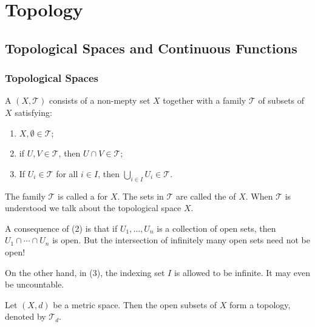 \part{Topology}
\chapter{Topological Spaces and Continuous Functions}
\section{Topological Spaces}
\begin{definition}
A  $(X,\mathcal{T})$ consists of a non-mepty set $X$ together with a family $\mathcal{T}$ of subsets of $X$ satisfying:
\begin{enumerate}[label=(\arabic*)]
\item $X,\emptyset\in\mathcal{T}$;
\item if $U,V\in\mathcal{T}$, then $U\cap V\in\mathcal{T}$;
\item If $U_i\in\mathcal{T}$ for all $i\in I$, then $\bigcup_{i\in I}U_i\in\mathcal{T}$.
\end{enumerate}
The family $\mathcal{T}$ is called a  for $X$. The sets in $\mathcal{T}$ are called the  of $X$. When $\mathcal{T}$ is understood we talk about the topological space $X$.
\end{definition}

\begin{remark}
A consequence of (2) is that if $U_1,\dots,U_n$ is a collection of open sets, then $U_1\cap\cdots\cap U_n$ is open. But the intersection of infinitely many open sets need not be open!

On the other hand, in (3), the indexing set $I$ is allowed to be infinite. It may even be uncountable.
\end{remark}

\begin{proposition}\label{prop:topo-metrisable}
Let $(X,d)$ be a metric space. Then the open subsets of $X$ form a topology, denoted by $\mathcal{T}_d$.
\end{proposition}

